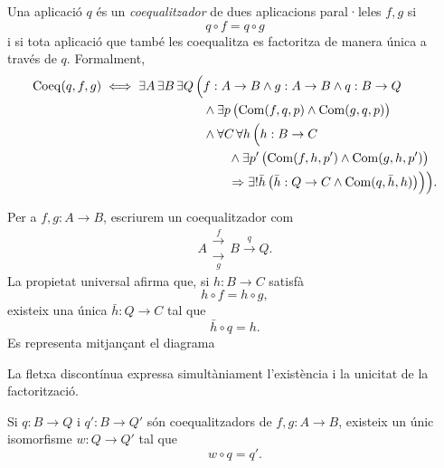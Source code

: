 \begin{definicio}[Coequalitzador]\label{def:coequalitzador}
Una aplicació \(q\) és un \emph{coequalitzador} de dues aplicacions paral·leles \(f,g\) si
\[
q\circ f=q\circ g
\]
i si tota aplicació que també les coequalitza es factoritza de manera única a través de \(q\). Formalment,
\[
\begin{aligned}
\operatorname{Coeq}(q,f,g)
\iff
\exists A\,\exists B\,\exists Q\,\Bigl(&
 f:A\to B\land g:A\to B\land q:B\to Q
\\
&{}\land
\exists p\,
 \bigl(\operatorname{Com}(f,q,p)\land\operatorname{Com}(g,q,p)\bigr)
\\
&{}\land
\forall C\,\forall h\,\Bigl(
 h:B\to C
\\
&\qquad{}\land
 \exists p'\,
 \bigl(\operatorname{Com}(f,h,p')\land\operatorname{Com}(g,h,p')\bigr)
\\
&\qquad{}\Rightarrow
 \exists!\bar h\,
 \bigl(\bar h:Q\to C\land\operatorname{Com}(q,\bar h,h)\bigr)
\Bigr)
\Bigr).
\end{aligned}
\]
\end{definicio}

\begin{notacio}\label{not:coequalitzador}
Per a \(f,g:A\to B\), escriurem un coequalitzador com
\[
A
\mathrel{\substack{\xrightarrow{\ f\ }\\[-0.6ex]\xrightarrow[\ g\ ]{}}}
B\xrightarrow{q}Q.
\]
La propietat universal afirma que, si \(h:B\to C\) satisfà
\[
h\circ f=h\circ g,
\]
existeix una única \(\bar h:Q\to C\) tal que
\[
\bar h\circ q=h.
\]
Es representa mitjançant el diagrama
\begin{center}
\end{center}
La fletxa discontínua expressa simultàniament l'existència i la unicitat de la factorització.
\end{notacio}

\begin{proposicio}\label{prop:coequalitzador-unic}
Si \(q:B\to Q\) i \(q':B\to Q'\) són coequalitzadors de \(f,g:A\to B\), existeix un únic isomorfisme \(w:Q\to Q'\) tal que
\[
w\circ q=q'.
\]
\end{proposicio}

